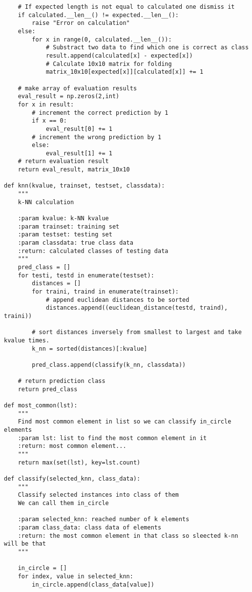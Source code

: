 \documentclass[11pt]{article}
\begin{document}
\begin{enumerate}[\indent a)]
\begin{verbatim}
    # If expected length is not equal to calculated one dismiss it
    if calculated.__len__() != expected.__len__():
        raise "Error on calculation"
    else:
        for x in range(0, calculated.__len__()):
            # Substract two data to find which one is correct as class
            result.append(calculated[x] - expected[x])
            # Calculate 10x10 matrix for folding
            matrix_10x10[expected[x]][calculated[x]] += 1

    # make array of evaluation results
    eval_result = np.zeros(2,int)
    for x in result:
        # increment the correct prediction by 1
        if x == 0:
            eval_result[0] += 1
        # increment the wrong prediction by 1
        else:
            eval_result[1] += 1
    # return evaluation result
    return eval_result, matrix_10x10

def knn(kvalue, trainset, testset, classdata):
    """
    k-NN calculation

    :param kvalue: k-NN kvalue
    :param trainset: training set
    :param testset: testing set
    :param classdata: true class data
    :return: calculated classes of testing data
    """
    pred_class = []
    for testi, testd in enumerate(testset):
        distances = []
        for traini, traind in enumerate(trainset):
            # append euclidean distances to be sorted
            distances.append((euclidean_distance(testd, traind), traini))

        # sort distances inversely from smallest to largest and take kvalue times.
        k_nn = sorted(distances)[:kvalue]

        pred_class.append(classify(k_nn, classdata))

    # return prediction class
    return pred_class

def most_common(lst):
    """
    Find most common element in list so we can classify in_circle elements
    :param lst: list to find the most common element in it
    :return: most common element...
    """
    return max(set(lst), key=lst.count)

def classify(selected_knn, class_data):
    """
    Classify selected instances into class of them
    We can call them in_circle

    :param selected_knn: reached number of k elements
    :param class_data: class data of elements
    :return: the most common element in that class so sleected k-nn will be that
    """

    in_circle = []
    for index, value in selected_knn:
        in_circle.append(class_data[value])


\end{verbatim}
\end{enumerate}
\end{document}
